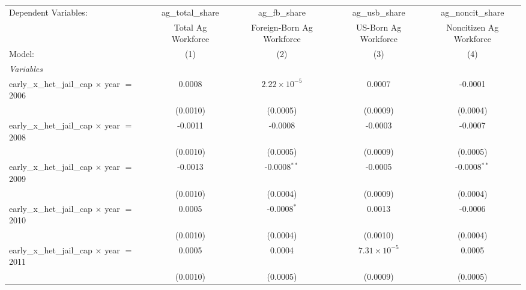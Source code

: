 
\begingroup
\centering
\begin{tabular}{lcccc}
   \tabularnewline \midrule \midrule
   Dependent Variables:                                 & ag\_total\_share      & ag\_fb\_share             & ag\_usb\_share         & ag\_noncit\_share\\    
                                                        & Total Ag Workforce    & Foreign-Born Ag Workforce & US-Born Ag Workforce   & Noncitizen Ag Workforce \\   
   Model:                                               & (1)                   & (2)                       & (3)                    & (4)\\  
   \midrule
   \emph{Variables}\\
   early\_x\_het\_jail\_cap $\times$ year $=$ 2006      & 0.0008                & $2.22\times 10^{-5}$      & 0.0007                 & -0.0001\\   
                                                        & (0.0010)              & (0.0005)                  & (0.0009)               & (0.0004)\\   
   early\_x\_het\_jail\_cap $\times$ year $=$ 2008      & -0.0011               & -0.0008                   & -0.0003                & -0.0007\\   
                                                        & (0.0010)              & (0.0005)                  & (0.0009)               & (0.0005)\\   
   early\_x\_het\_jail\_cap $\times$ year $=$ 2009      & -0.0013               & -0.0008$^{**}$            & -0.0005                & -0.0008$^{**}$\\   
                                                        & (0.0010)              & (0.0004)                  & (0.0009)               & (0.0004)\\   
   early\_x\_het\_jail\_cap $\times$ year $=$ 2010      & 0.0005                & -0.0008$^{*}$             & 0.0013                 & -0.0006\\   
                                                        & (0.0010)              & (0.0004)                  & (0.0010)               & (0.0004)\\   
   early\_x\_het\_jail\_cap $\times$ year $=$ 2011      & 0.0005                & 0.0004                    & $7.31\times 10^{-5}$   & 0.0005\\   
                                                        & (0.0010)              & (0.0005)                  & (0.0009)               & (0.0005)\\   

\end{tabular}
